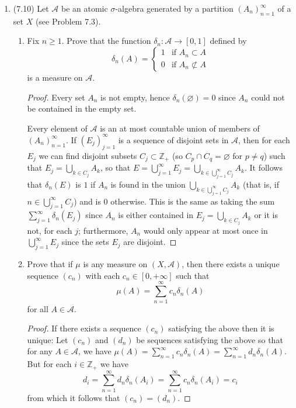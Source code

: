 \documentclass[11pt]{article}
\begin{document}
\begin{enumerate}
    \item (7.10) Let $\mathscr{A}$ be an atomic $\sigma$-algebra generated by a partition $(A_n)_{n=1}^\infty$ of a set $X$ (see Problem 7.3). \begin{enumerate}
        \item Fix $n\geq 1$. Prove that the function $\delta_n\colon\mathscr{A}\to [0,1]$ defined by \[\delta_n(A) = \begin{cases}
            1 &\text{if } A_n\subset A\\
            0 &\text{if } A_n\not\subset A
        \end{cases}\] is a measure on $\mathscr{A}$. \begin{proof}
            Every set $A_n$ is not empty, hence $\delta_n(\varnothing) = 0$ since $A_n$ could not be contained in the empty set.

            Every element of $\mathscr{A}$ is an at most countable union of members of $(A_n)_{n=1}^\infty$. If $(E_j)_{j=1}^\infty$ is a sequence of disjoint sets in $\mathscr{A}$, then for each $E_j$ we can find disjoint subsets $C_j \subset \mathbb{Z}_+$ (so $C_p\cap C_q = \varnothing$ for $p\neq q$) such that $E_j = \bigcup_{k\in C_j}A_k$, so that $E = \bigcup_{j=1}^\infty E_j = \bigcup_{k\in \bigcup_{j=1}^\infty C_j} A_k$. It follows that $\delta_n(E)$ is $1$ if $A_n$ is found in the union $\bigcup_{k\in \bigcup_{j=1}^\infty C_j} A_k$ (that is, if $n\in \bigcup_{j=1}^\infty C_j$) and is $0$ otherwise. This is the same as taking the sum $\sum_{j=1}^\infty \delta_n(E_j)$ since $A_n$ is either contained in $E_j = \bigcup_{k\in C_j}A_k$ or it is not, for each $j$; furthermore, $A_n$ would only appear at most once in $\bigcup_{j=1}^\infty E_j$ since the sets $E_j$ are disjoint.
        \end{proof}
        \item Prove that if $\mu$ is any measure on $(X,\mathscr{A})$, then there exists a unique sequence $(c_n)$ with each $c_n\in[0,+\infty]$ such that \[\mu(A) = \sum_{n=1}^\infty c_n\delta_n(A)\] for all $A\in\mathscr{A}$. \begin{proof}
            If there exists a sequence $(c_n)$ satisfying the above then it is unique: Let $(c_n)$ and $(d_n)$ be sequences satisfying the above so that for any $A\in\mathscr{A}$, we have $\mu(A) = \sum_{n=1}^\infty c_n\delta_n(A) = \sum_{n=1}^\infty d_n\delta_n(A)$. But for each $i\in\mathbb{Z}_+$ we have \[d_i = \sum_{n=1}^\infty d_n\delta_n(A_i) = \sum_{n=1}^\infty c_n\delta_n(A_i)= c_i\] from which it follows that $(c_n) = (d_n)$.


\end{proof}
\end{enumerate}
\end{enumerate}
\end{document}
